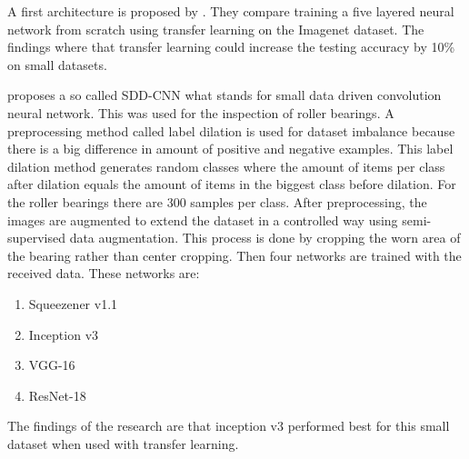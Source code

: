 	A first architecture is proposed by \cite{Chandrarathne2019}. They compare training a five layered neural network from scratch using transfer learning on the Imagenet dataset. The findings where that transfer learning could increase the testing accuracy by 10\% on small datasets.
	
	\cite{Xu2019} proposes a so called SDD-CNN what stands for small data driven convolution neural network. This was used for the inspection of roller bearings. A preprocessing method called label dilation is used for dataset imbalance because there is a big difference in amount of positive and negative examples. This label dilation method generates random classes where the amount of items per class after dilation equals the amount of items in the biggest class before dilation. For the roller bearings there are 300 samples per class. After preprocessing, the images are augmented to extend the dataset in a controlled way using semi-supervised data augmentation. This process is done by cropping the worn area of the bearing rather than center cropping. Then four networks are trained with the received data. These networks are: 
	\begin{enumerate}
	\item Squeezener v1.1
	\item Inception v3
	\item VGG-16 
	\item ResNet-18
	\end{enumerate}

The findings of the research are that inception v3 performed best for this small dataset when used with transfer learning.


			